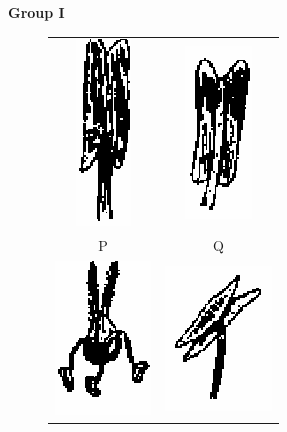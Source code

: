 \documentclass[journal,12pt,onecolumn]{IEEEtran}
\theoremstyle{remark}
\begin{document}
\begin{enumerate}
    \begin{minipage}{0.6\textwidth}
        \textbf{Group I }
        \begin{figure}[H]
            \centering
            \begin{tabular}{cc}
                 \includegraphics[width=0.15\columnwidth]{fig26.png} & \includegraphics[width=0.2\columnwidth]{fig27.png} \\
                 P & Q \\[1em]
                 \includegraphics[width=0.2\columnwidth]{fig28.png} & \includegraphics[width=0.2\columnwidth]{fig29.png} \\

\end{tabular}
\end{figure}
\end{minipage}
\end{enumerate}
\end{document}
